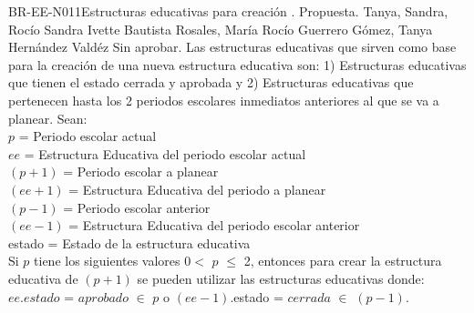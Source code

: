 \begin{BusinessRule}{BR-EE-N011}{Estructuras educativas para creación}
	{\bcCondition}    %
	{\btEnabler}     %
	{\blControlling}    %
	.
	\BRItem[Estado] Propuesta.
	 Tanya, Sandra, Rocío
	 Sandra Ivette Bautista Rosales, María Rocío Guerrero Gómez, Tanya Hernández Valdéz
	 Sin aprobar.
	\BRItem[Descripción] Las estructuras educativas que sirven como base para la creación de una nueva estructura educativa son: 1) Estructuras educativas que tienen el estado cerrada y aprobada y 2) Estructuras educativas que pertenecen hasta los 2 periodos escolares inmediatos anteriores al que se va a planear. 
	\BRItem[Sentencia]  Sean:\\
	$p$ = Periodo escolar actual\\
	$ee$ = Estructura Educativa del periodo escolar actual\\
	$(p+1)$ = Periodo escolar a planear\\
	$(ee+1)$ = Estructura Educativa del periodo a planear\\
	$(p-1)$ = Periodo escolar anterior\\
	$(ee-1)$ = Estructura Educativa del periodo escolar anterior\\
	estado = Estado de la estructura educativa\\
	Si $p$ tiene los siguientes valores 0$<$ $p$ $\leq$ 2, entonces para crear la estructura educativa de $(p+1)$ se pueden utilizar las estructuras educativas donde:\\
	$ee.estado$ = $aprobado$ $\in$ $p$ o $(ee-1)$.estado = $cerrada$ $\in$ $(p-1)$.


\end{BusinessRule}
